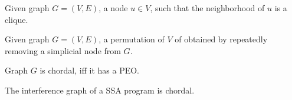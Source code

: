 
\begin{definition}
    Given graph $G = (V, E)$, a node $u \in V$, such that  the neighborhood of $u$ is a clique.
\end{definition}

\begin{definition}
    Given graph $G = (V, E)$, a permutation of $V$ of obtained by repeatedly removing a simplicial node from $G$.
\end{definition}

\begin{definition}[Chordality]
    Graph $G$ is chordal, iff it has a PEO.
\end{definition}

\begin{theorem}[Chordality]
    The interference graph of a SSA program is chordal.
\end{theorem}